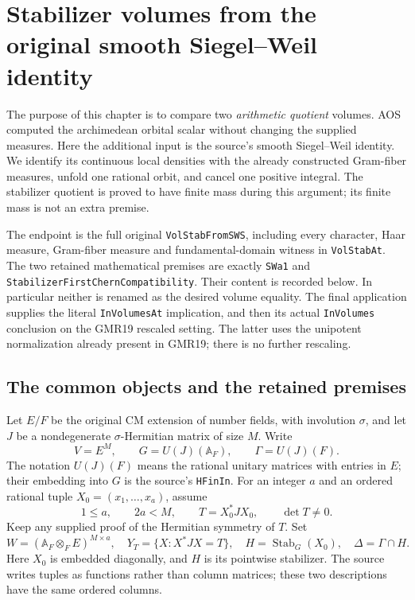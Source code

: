 \section{Stabilizer volumes from the original smooth Siegel--Weil identity}

The purpose of this chapter is to compare two \emph{arithmetic quotient}
volumes.  AOS computed the archimedean orbital scalar without changing
the supplied measures.  Here the additional input is the source's
smooth Siegel--Weil identity.  We identify its continuous local densities
with the already constructed Gram-fiber measures, unfold one rational
orbit, and cancel one positive integral.  The stabilizer quotient is
proved to have finite mass during this argument; its finite mass is
not an extra premise.

The endpoint is the full original \texttt{VolStabFromSWS}, including
every character, Haar measure, Gram-fiber measure and fundamental-domain
witness in \texttt{VolStabAt}.  The two retained mathematical premises
are exactly \texttt{SWa1} and
\texttt{StabilizerFirstChern}\allowbreak\texttt{Compatibility}.  Their content is recorded
below.  In particular neither is renamed as the desired volume equality.
The final application supplies the literal \texttt{InVolumesAt}
implication, and then its actual \texttt{InVolumes} conclusion on the
GMR19 rescaled setting.  The latter uses the unipotent normalization
already present in GMR19; there is no further rescaling.

\subsection{The common objects and the retained premises}

Let $E/F$ be the original CM extension of number fields, with involution
$\sigma$, and let $J$ be a nondegenerate $\sigma$-Hermitian matrix of
size $M$.  Write
\[
 V=E^M,\qquad G=U(J)(\mathbb A_F),\qquad \Gamma=U(J)(F).
 \tag{SVW.1}
\]
The notation $U(J)(F)$ means the rational unitary matrices with entries
in $E$; their embedding into $G$ is the source's
\texttt{HFinIn}.  For an integer $a$ and an ordered rational tuple
$X_0=(x_1,\ldots,x_a)$, assume
\[
 1\leq a,\qquad 2a<M,\qquad T=X_0^*JX_0,\qquad \det T\ne0.
 \tag{SVW.2}
\]
Keep any supplied proof of the Hermitian symmetry of $T$.  Set
\[
 W=(\mathbb A_F\otimes_F E)^{M\times a},\quad
 Y_T=\{X:X^*JX=T\},\quad H=\operatorname{Stab}_G(X_0),\quad
 \Delta=\Gamma\cap H.
 \tag{SVW.3}
\]
Here $X_0$ is embedded diagonally, and $H$ is its pointwise stabilizer.
The source writes tuples as functions rather than column matrices;
these two descriptions have the same ordered columns.

